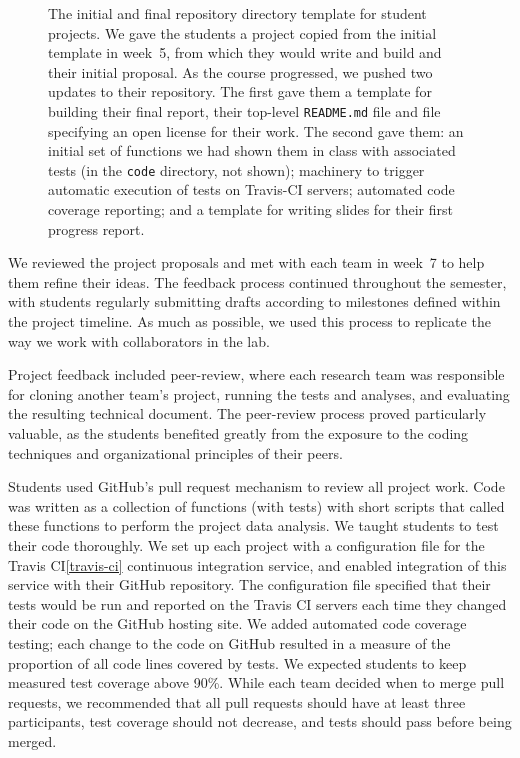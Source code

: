 \begin{figure}
\centering

\caption{The initial and final repository directory template for student
    projects.  We gave the students a project copied from the initial template
    in week~5, from which they would write and build and their initial
    proposal.  As the course progressed, we pushed two updates to their
    repository. The first gave them a template for building their final
    report, their top-level \texttt{README.md} file and file specifying an
    open license for their work. The second gave them: an initial set of
    functions we had shown them in class with associated tests (in the
    \texttt{code} directory, not shown); machinery to trigger automatic
    execution of tests on Travis-CI servers; automated code coverage
    reporting; and a template for writing slides for their first progress
    report.}
\label{fig:repo}
\end{figure}

We reviewed the project proposals and met with each team in week~7 to help
them refine their ideas.
The feedback process continued throughout the semester, with students
regularly submitting drafts according to milestones defined within the project
timeline.
As much as possible, we used this process to replicate the way we
work with collaborators in the lab.

Project feedback included peer-review, where each research team was
responsible for cloning another team's project, running the tests and
analyses, and evaluating the resulting technical document.
The peer-review process proved particularly valuable, as the students 
benefited greatly from the exposure to the coding techniques and 
organizational principles of their peers.

Students used GitHub's pull request mechanism to review all project work.
Code was written as a collection of functions (with tests) with short
scripts that called these functions to perform the project data analysis.
We taught students to test their code thoroughly.
We set up each project with a configuration file for the Travis
CI\cref{travis-ci} continuous integration service, and enabled integration of
this service with their GitHub repository.  The configuration file specified
that their tests would be run and reported on the Travis CI servers each
time they changed their code on the GitHub hosting site.
We added automated code coverage testing; each change to the code on GitHub
resulted in a measure of the proportion of all code lines covered by tests.
We expected students to keep measured test coverage above 90\%.
While each team decided when to merge pull requests, we recommended that
all pull requests should have at least three participants, test coverage
should not decrease, and tests should pass before being merged.

